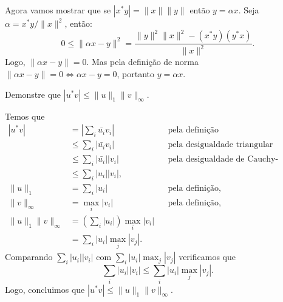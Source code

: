 \documentclass[a4paper,12pt, leqno, answers]{exam}
\begin{document}
\begin{questions}
\begin{solution}
        Agora vamos mostrar que se $| x^* y | = \| x \| \| y \|$ ent\~{a}o $y = \alpha x$. Seja $\alpha = x^* y / \| x \|^2$, ent\~{a}o:
        \[
        0 \leq \| \alpha x - y \|^2 = \frac{\| y \| ^2 \| x \|^2 - \left( x^* y \right) \left( y^* x \right)}{\| x \|^2}.
        \]
        Logo, $\| \alpha x - y \| = 0$. Mas pela defini\c{c}\~{a}o de norma $\| \alpha x - y \| = 0 \iff \alpha x - y = 0$, portanto $y = \alpha x$.
    \end{solution}

    \question Demonstre que $| u^* v | \leq \| u \|_1 \| v \|_\infty$.
    \begin{solution}
        Temos que
        \begin{align*}
            \left| u^* v \right| &= \left| \sum_i \bar{u_i} v_i \right| && \text{pela defini\c{c}\~{a}o} \\
            &\leq \sum_i \left| \bar{u_i} v_i \right| && \text{pela desigualdade triangular} \\
            &\leq \sum_i \left| \bar{u_i} \right| \left| v_i \right| && \text{pela desigualdade de Cauchy-Schwarz} \\
            &\leq \sum_i \left| u_i \right| \left| v_i \right|, \\
            \| u \|_1 &= \sum_i | u_i | && \text{pela defini\c{c}\~{a}o,} \\
            \| v \|_\infty &= \max_i | v_i | && \text{pela defini\c{c}\~{a}o,} \\
            \| u \|_1 \| v \|_\infty &= \left( \sum_i | u_i | \right) \max_i | v_i | \\
            &= \sum_i | u_i | \max_j | v_j |.
        \end{align*}
        Comparando $\sum_i | u_i | | v_i |$ com $\sum_i | u_i | \max_j | v_j |$ verificamos que
        \[
        \sum_i | u_i | | v_i | \leq \sum_i | u_i | \max_j | v_j |.
        \]
        Logo, concluimos que $| u^* v | \leq \| u \|_1 \| v \|_\infty$.
    \end{solution}


\end{questions}
\end{document}
